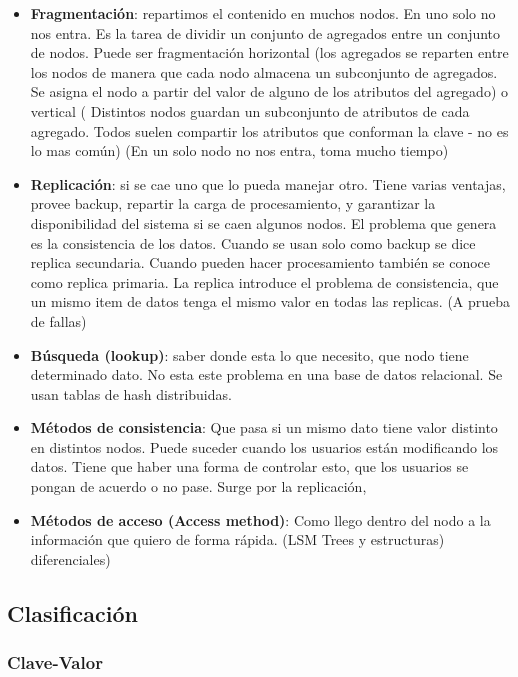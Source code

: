 \begin{itemize}
\item \textbf{Fragmentación}: repartimos el contenido en muchos nodos. En uno solo no nos entra. Es la tarea de dividir un conjunto de agregados entre un conjunto de nodos. Puede ser fragmentación horizontal (los agregados se reparten entre los nodos de manera que cada nodo almacena un subconjunto de agregados. Se asigna el nodo a partir del valor de alguno de los atributos del agregado) o vertical ( Distintos nodos guardan un subconjunto de atributos de cada agregado. Todos suelen compartir los atributos que conforman la clave - no es lo mas común) (En un solo nodo no nos entra, toma mucho tiempo)
\item \textbf{Replicación}: si se cae uno que lo pueda manejar otro. Tiene varias ventajas, provee backup, repartir la carga de procesamiento, y garantizar la disponibilidad del sistema si se caen algunos nodos. El problema que genera es la consistencia de los datos. Cuando se usan solo como backup se dice replica secundaria. Cuando pueden hacer procesamiento también se conoce como replica primaria. La replica introduce el problema de consistencia, que un mismo item de datos tenga el mismo valor en todas las replicas. (A prueba de fallas)
\item \textbf{Búsqueda (lookup)}: saber donde esta lo que necesito, que nodo tiene determinado dato. No esta este problema en una base de datos relacional. Se usan tablas de hash distribuidas.
\item \textbf{Métodos de consistencia}: Que pasa si un mismo dato tiene valor distinto en distintos nodos. Puede suceder cuando los usuarios están modificando los datos. Tiene que haber una forma de controlar esto, que los usuarios se pongan de acuerdo o no pase. Surge por la replicación,
\item \textbf{Métodos de acceso (Access method)}: Como llego dentro del nodo a la información que quiero de forma rápida. (LSM Trees y estructuras) diferenciales)
\end{itemize}



\subsection*{Clasificación}
\subsubsection*{Clave-Valor}

